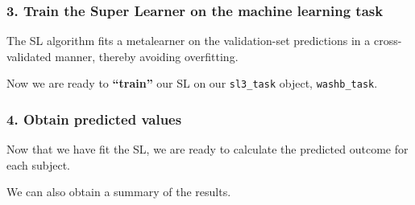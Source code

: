 \documentclass[12pt, krantz2,]{krantz}
\newenvironment{Shaded}{\begin{snugshade}}{\end{snugshade}}
\newcommand{\CommentTok}[1]{\textcolor[rgb]{0.37,0.37,0.37}{\textit{#1}}}
\newcommand{\DecValTok}[1]{\textcolor[rgb]{0.06,0.06,0.06}{#1}}
\newcommand{\FloatTok}[1]{\textcolor[rgb]{0.06,0.06,0.06}{#1}}
\newcommand{\KeywordTok}[1]{\textcolor[rgb]{0.27,0.27,0.27}{\textbf{#1}}}
\newcommand{\NormalTok}[1]{#1}
\newcommand{\OperatorTok}[1]{\textcolor[rgb]{0.43,0.43,0.43}{\textbf{#1}}}
\newcommand{\StringTok}[1]{\textcolor[rgb]{0.5,0.5,0.5}{#1}}
\theoremstyle{definition}
\theoremstyle{definition}
\theoremstyle{definition}
\newcommand{\1}{\mathbbm{1}}
\begin{document}
\hypertarget{train-the-super-learner-on-the-machine-learning-task}{%
\subsubsection*{3. Train the Super Learner on the machine learning task}\label{train-the-super-learner-on-the-machine-learning-task}}


The SL algorithm fits a metalearner on the validation-set predictions in a
cross-validated manner, thereby avoiding overfitting.

Now we are ready to \textbf{``train''} our SL on our \texttt{sl3\_task} object, \texttt{washb\_task}.

\begin{Shaded}
\end{Shaded}

\hypertarget{obtain-predicted-values}{%
\subsubsection*{4. Obtain predicted values}\label{obtain-predicted-values}}


Now that we have fit the SL, we are ready to calculate the predicted outcome
for each subject.

\begin{Shaded}
\end{Shaded}

We can also obtain a summary of the results.
\end{document}

